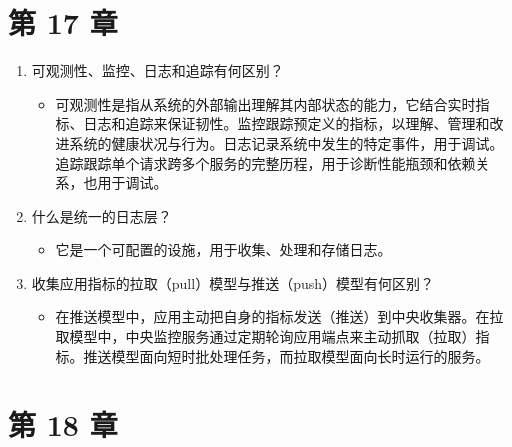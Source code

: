 \section*{第 17 章}

\begin{enumerate}
\item 可观测性、监控、日志和追踪有何区别？

\begin{itemize}
\item 可观测性是指从系统的外部输出理解其内部状态的能力，它结合实时指标、日志和追踪来保证韧性。监控跟踪预定义的指标，以理解、管理和改进系统的健康状况与行为。日志记录系统中发生的特定事件，用于调试。追踪跟踪单个请求跨多个服务的完整历程，用于诊断性能瓶颈和依赖关系，也用于调试。
\end{itemize}
\item 什么是统一的日志层？

\begin{itemize}
\item 它是一个可配置的设施，用于收集、处理和存储日志。
\end{itemize}
\item 收集应用指标的拉取（pull）模型与推送（push）模型有何区别？

\begin{itemize}
\item 在推送模型中，应用主动把自身的指标发送（推送）到中央收集器。在拉取模型中，中央监控服务通过定期轮询应用端点来主动抓取（拉取）指标。推送模型面向短时批处理任务，而拉取模型面向长时运行的服务。
\end{itemize}
\end{enumerate}

\section*{第 18 章}

